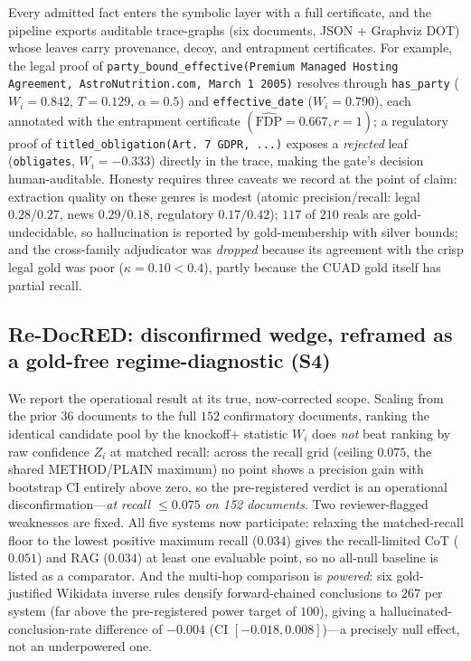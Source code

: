 \documentclass[11pt,letterpaper]{article}
\begin{document}
Every admitted fact enters the symbolic layer with a full certificate, and the pipeline exports auditable trace-graphs (six documents, JSON + Graphviz DOT) whose leaves carry provenance, decoy, and entrapment certificates. For example, the legal proof of \texttt{party\_bound\_effective(Premium Managed Hosting Agreement, AstroNutrition.com, March 1 2005)} resolves through \texttt{has\_party} ($W_i=0.842$, $T=0.129$, $\alpha=0.5$) and \texttt{effective\_date} ($W_i=0.790$), each annotated with the entrapment certificate $(\widehat{\mathrm{FDP}}=0.667, r=1)$; a regulatory proof of \texttt{titled\_obligation(Art.\ 7 GDPR, ...)} exposes a \emph{rejected} leaf (\texttt{obligates}, $W_i=-0.333$) directly in the trace, making the gate's decision human-auditable. Honesty requires three caveats we record at the point of claim: extraction quality on these genres is modest (atomic precision/recall: legal $0.28/0.27$, news $0.29/0.18$, regulatory $0.17/0.42$); $117$ of $210$ reals are gold-undecidable, so hallucination is reported by gold-membership with silver bounds; and the cross-family adjudicator was \emph{dropped} because its agreement with the crisp legal gold was poor ($\kappa=0.10<0.4$), partly because the CUAD gold itself has partial recall.

\subsection{Re-DocRED: disconfirmed wedge, reframed as a gold-free regime-diagnostic (S4)}

We report the operational result at its true, now-corrected scope. Scaling from the prior $36$ documents to the full $152$ confirmatory documents, ranking the identical candidate pool by the knockoff+ statistic $W_i$ does \emph{not} beat ranking by raw confidence $Z_i$ at matched recall: across the recall grid (ceiling $0.075$, the shared METHOD/PLAIN maximum) no point shows a precision gain with bootstrap CI entirely above zero, so the pre-registered verdict is an operational disconfirmation---\emph{at recall $\le0.075$ on 152 documents}. Two reviewer-flagged weaknesses are fixed. All five systems now participate: relaxing the matched-recall floor to the lowest positive maximum recall ($0.034$) gives the recall-limited CoT ($0.051$) and RAG ($0.034$) at least one evaluable point, so no all-null baseline is listed as a comparator. And the multi-hop comparison is \emph{powered}: six gold-justified Wikidata inverse rules densify forward-chained conclusions to $267$ per system (far above the pre-registered power target of $100$), giving a hallucinated-conclusion-rate difference of $-0.004$ (CI $[-0.018,0.008]$)---a precisely null effect, not an underpowered one.
\end{document}
